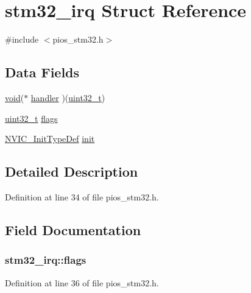 \hypertarget{structstm32__irq}{\section{stm32\-\_\-irq Struct Reference}
\label{structstm32__irq}
}


{\ttfamily \#include $<$pios\-\_\-stm32.\-h$>$}

\subsection*{Data Fields}
\begin{DoxyCompactItemize}
\item 
\hyperlink{group___n_a_m_e_ga18028b8badbf1ea7e704ccac3c488e82}{void}($\ast$ \hyperlink{structstm32__irq_a4d9346b23aedfb76b515e0273e9321de}{handler} )(\hyperlink{stdint_8h_a435d1572bf3f880d55459d9805097f62}{uint32\-\_\-t})
\item 
\hyperlink{stdint_8h_a435d1572bf3f880d55459d9805097f62}{uint32\-\_\-t} \hyperlink{structstm32__irq_a1f30de822fa143fc12ecff712d96df7c}{flags}
\item 
\hyperlink{struct_n_v_i_c___init_type_def}{N\-V\-I\-C\-\_\-\-Init\-Type\-Def} \hyperlink{structstm32__irq_aef3e74e894b4025023b6be1ab8b4348f}{init}
\end{DoxyCompactItemize}


\subsection{Detailed Description}


Definition at line 34 of file pios\-\_\-stm32.\-h.



\subsection{Field Documentation}
\hypertarget{structstm32__irq_a1f30de822fa143fc12ecff712d96df7c}{
\subsubsection[{flags}]{ stm32\-\_\-irq\-::flags}}\label{structstm32__irq_a1f30de822fa143fc12ecff712d96df7c}


Definition at line 36 of file pios\-\_\-stm32.\-h.

